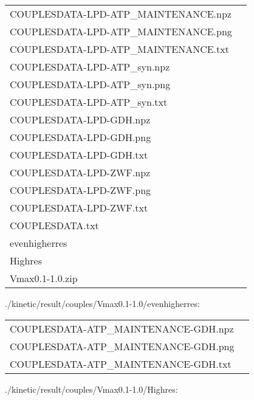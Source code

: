 \documentclass[a4paper, parskip=full]{scrreprt}
\begin{document}
\begin{longtable}{ll}
COUPLESDATA-LPD-ATP\_MAINTENANCE.npz\\
COUPLESDATA-LPD-ATP\_MAINTENANCE.png\\
COUPLESDATA-LPD-ATP\_MAINTENANCE.txt\\
COUPLESDATA-LPD-ATP\_syn.npz\\
COUPLESDATA-LPD-ATP\_syn.png\\
COUPLESDATA-LPD-ATP\_syn.txt\\
COUPLESDATA-LPD-GDH.npz\\
COUPLESDATA-LPD-GDH.png\\
COUPLESDATA-LPD-GDH.txt\\
COUPLESDATA-LPD-ZWF.npz\\
COUPLESDATA-LPD-ZWF.png\\
COUPLESDATA-LPD-ZWF.txt\\
COUPLESDATA.txt\\
evenhigherres\\
Highres\\
Vmax0.1-1.0.zip\\
\end{longtable}

./kinetic/result/couples/Vmax0.1-1.0/evenhigherres:

\begin{longtable}{ll}
COUPLESDATA-ATP\_MAINTENANCE-GDH.npz\\
COUPLESDATA-ATP\_MAINTENANCE-GDH.png\\
COUPLESDATA-ATP\_MAINTENANCE-GDH.txt\\
\end{longtable}

./kinetic/result/couples/Vmax0.1-1.0/Highres:
\end{document}
